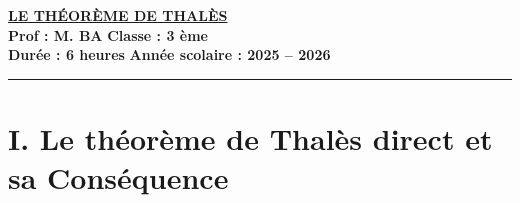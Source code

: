 \documentclass[12pt,a4paper]{article}
\begin{document}
\begin{center}
    \Large\textbf{\underline{\textcolor{myred}{LE THÉORÈME DE THALÈS}}}\\[0.2cm]
    \normalsize\textbf{Prof : M. BA} \hfill \textbf{Classe : 3 ème}\\[0.1cm]
    \textbf{Durée : 6 heures} \hfill \textbf{Année scolaire : 2025 -- 2026}
\end{center}
\hrule
\vspace{0.3cm}

\section*{\color{myred}I. Le théorème de Thalès direct et sa  Conséquence}
\end{document}
